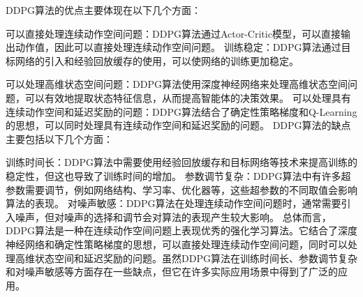DDPG算法的优点主要体现在以下几个方面：

可以直接处理连续动作空间问题：DDPG算法通过Actor-Critic模型，可以直接输出动作值，因此可以直接处理连续动作空间问题。
训练稳定：DDPG算法通过目标网络的引入和经验回放缓存的使用，可以使网络的训练更加稳定。

可以处理高维状态空间问题：DDPG算法使用深度神经网络来处理高维状态空间问题，可以有效地提取状态特征信息，从而提高智能体的决策效果。
可以处理具有连续动作空间和延迟奖励的问题：DDPG算法结合了确定性策略梯度和Q-Learning的思想，可以同时处理具有连续动作空间和延迟奖励的问题。
DDPG算法的缺点主要包括以下几个方面：

训练时间长：DDPG算法中需要使用经验回放缓存和目标网络等技术来提高训练的稳定性，但这也导致了训练时间的增加。
参数调节复杂：DDPG算法中有许多超参数需要调节，例如网络结构、学习率、优化器等，这些超参数的不同取值会影响算法的表现。
对噪声敏感：DDPG算法在处理连续动作空间问题时，通常需要引入噪声，但对噪声的选择和调节会对算法的表现产生较大影响。
总体而言，DDPG算法是一种在连续动作空间问题上表现优秀的强化学习算法。它结合了深度神经网络和确定性策略梯度的思想，可以直接处理连续动作空间问题，同时可以处理高维状态空间和延迟奖励的问题。虽然DDPG算法在训练时间长、参数调节复杂和对噪声敏感等方面存在一些缺点，但它在许多实际应用场景中得到了广泛的应用。
